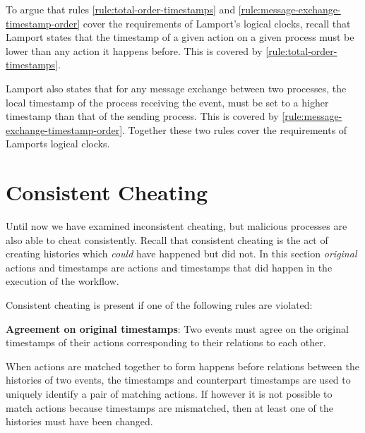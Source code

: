 	\newpar To argue that rules \ref{rule:total-order-timestamps} and \ref{rule:message-exchange-timestamp-order} cover the requirements of Lamport's logical clocks, recall that Lamport states that the timestamp of a given action on a given process must be lower than any action it happens before. This is covered by \autoref{rule:total-order-timestamps}.
	
	Lamport also states that for any message exchange between two processes, the local timestamp of the process receiving the event, must be set to a higher timestamp than that of the sending process. This is covered by \autoref{rule:message-exchange-timestamp-order}. Together these two rules cover the requirements of Lamports logical clocks.
	
	\section{Consistent Cheating}
	Until now we have examined inconsistent cheating, but malicious processes are also able to cheat consistently. Recall that consistent cheating is the act of creating histories which \textit{could} have happened but did not. In this section \textit{original} actions and timestamps are actions and timestamps that did happen in the execution of the workflow. 

	\newpar Consistent cheating is present if one of the following rules are violated:

	\begin{ruledef}
		\textbf{Agreement on original timestamps}: Two events must agree on the original timestamps of their actions corresponding to their relations to each other.
		\label{rule:agreement-on-original-timestamps}
	\end{ruledef}
	
	\noindent When actions are matched together to form happens before relations between the histories of two events, the timestamps and counterpart timestamps are used to uniquely identify a pair of matching actions. If however it is not possible to match actions because timestamps are mismatched, then at least one of the histories must have been changed. 
	
